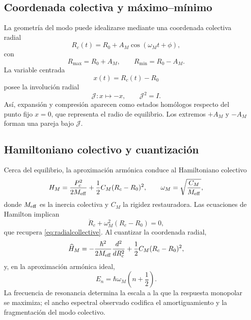 \documentclass[11pt]{amsart}
\theoremstyle{definition}
\theoremstyle{remark}
\begin{document}
\subsection{Coordenada colectiva y máximo--mínimo}
La geometría del modo puede idealizarse mediante una coordenada colectiva radial
\begin{equation}\label{eq:radialcollective}
  R_c(t)=R_0+A_M\cos(\omega_M t+\phi),
\end{equation}
con
\begin{equation}
  R_{\max}=R_0+A_M,
  \qquad
  R_{\min}=R_0-A_M.
\end{equation}
La variable centrada
\begin{equation}
  x(t)=R_c(t)-R_0
\end{equation}
posee la involución radial
\begin{equation}\label{eq:radialinvolution}
  \mathcal J:x\mapsto -x,
  \qquad
  \mathcal J^2=I.
\end{equation}
Así, expansión y compresión aparecen como estados homólogos respecto del punto fijo $x=0$, que representa el radio de equilibrio. Los extremos $+A_M$ y $-A_M$ forman una pareja bajo $\mathcal J$.

\subsection{Hamiltoniano colectivo y cuantización}
Cerca del equilibrio, la aproximación armónica conduce al Hamiltoniano colectivo
\begin{equation}\label{eq:monoham}
 H_M=\frac{P_c^2}{2M_{\rm eff}}
     +\frac12 C_M(R_c-R_0)^2,
 \qquad
 \omega_M=\sqrt{\frac{C_M}{M_{\rm eff}}},
\end{equation}
donde $M_{\rm eff}$ es la inercia colectiva y $C_M$ la rigidez restauradora. Las ecuaciones de Hamilton implican
\begin{equation}
  \ddot R_c+\omega_M^2(R_c-R_0)=0,
\end{equation}
que recupera \eqref{eq:radialcollective}. Al cuantizar la coordenada radial,
\begin{equation}\label{eq:monohamq}
 \widehat H_M=
 -\frac{\hbar^2}{2M_{\rm eff}}\frac{d^2}{dR_c^2}
 +\frac12 C_M(R_c-R_0)^2,
\end{equation}
y, en la aproximación armónica ideal,
\begin{equation}
 E_n=\hbar\omega_M\left(n+\frac12\right).
\end{equation}
La frecuencia de resonancia determina la escala a la que la respuesta monopolar se maximiza; el ancho espectral observado codifica el amortiguamiento y la fragmentación del modo colectivo.
\end{document}
